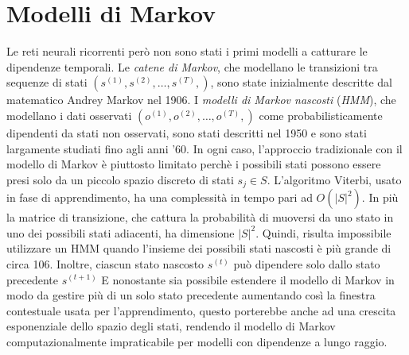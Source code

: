 \section{Modelli di Markov} %
Le reti neurali ricorrenti per\`o non sono stati i primi modelli a catturare le dipendenze temporali.
Le \emph{catene di Markov}, che modellano le transizioni tra sequenze di stati $(s^{(1)}, s^{(2)}, \dots, s^{(T)},)$, sono state inizialmente descritte dal matematico Andrey Markov nel 1906.
I \emph{modelli di Markov nascosti} (\emph{HMM}), che modellano i dati osservati $(o^{(1)}, o^{(2)}, \dots, o^{(T)},)$ come probabilisticamente dipendenti da stati non osservati, sono stati descritti nel 1950 e sono stati largamente studiati fino agli anni '60.
In ogni caso, l'approccio tradizionale con il modello di Markov \`e piuttosto limitato perch\`e i possibili stati possono essere presi solo da un piccolo spazio discreto di stati $ s_j \in S$.
L'algoritmo Viterbi, usato in fase di apprendimento, ha una complessit\`a in tempo pari ad $O(|S|^2)$.
In pi\`u la matrice di transizione, che cattura la probabilit\`a di muoversi da uno stato in uno dei possibili stati adiacenti, ha dimensione $|S|^2$.
Quindi, risulta impossibile utilizzare un HMM quando l'insieme dei possibili stati nascosti \`e pi\`u grande di circa 106.
Inoltre, ciascun stato nascosto $s^{(t)}$ pu\`o dipendere solo dallo stato precedente $s^{(t+1)}$
E nonostante sia possibile estendere il modello di Markov in modo da gestire pi\`u di un solo stato precedente aumentando cos\`i la finestra contestuale usata per l'apprendimento, questo porterebbe anche ad una crescita esponenziale dello spazio degli stati, rendendo il modello di Markov computazionalmente impraticabile per modelli con dipendenze a lungo raggio.

